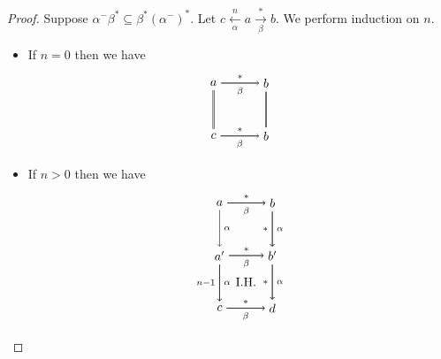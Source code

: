 \documentclass[autodetect-enginem]{article}
\theoremstyle{plain}
\theoremstyle{definition}
\begin{document}
\begin{proof}
    Suppose $\alpha^-\beta^* \subseteq \beta^*(\alpha^-)^*$.
    Let $c \xleftarrow[\alpha]{n} a \xrightarrow[\beta]{*} b$.
    We perform induction on $n$.
    \begin{itemize}
        \item If $n = 0$ then we have
            \[
            \begin{tikzpicture}[auto]
                \node (a) at (0,0) {$a$}; \node (b) at (1.5,0) {$b$};
                \node (c) at (0,-1.5) {$c$}; \node (b') at (1.5,-1.5) {$b$};
                \draw[->] (a) to node[above]{$\scriptstyle *$} (b);
                \draw[] (a) to node[below]{$\scriptstyle \beta$} (b);

                \draw[double] (a) to (c);

                \draw[double] (b) to (b');

                \draw[->] (c) to node[above]{$\scriptstyle *$} (b');
                \draw[] (c) to node[below]{$\scriptstyle \beta$} (b');

            \end{tikzpicture}
        \]
        \item If $n > 0$ then we have
            \[
                \begin{tikzpicture}[auto]
                \node (a) at (0,0) {$a$}; \node (b) at (1.5, 0) {$b$};
                \node (a') at (0, -1.5) {$a'$}; \node (b') at (1.5, -1.5) {$b'$};
                \node (c) at (0, -3) {$c$}; \node (d) at (1.5,-3) {$d$};
                \node (IH) at (0.75, -(1.5 + 0.75) {I.H.};

                \draw[->] (a) to node[above]{$\scriptstyle *$} (b);
                \draw[->] (a) to node[below]{$\scriptstyle \beta$} (b);
                
                \draw[->] (a) to node{$\scriptstyle \alpha$} (a');
                
                \draw[->] (a') to node[swap]{$\scriptstyle n-1$} (c);
                \draw[->] (a') to node{$\scriptstyle \alpha$} (c);

                \draw[->] (b) to node[swap]{$\scriptstyle *$} (b');
                \draw[->] (b) to node{$\scriptstyle \alpha$} (b');

                \draw[->] (b') to node[swap]{$\scriptstyle *$} (d);
                \draw[->] (b') to node{$\scriptstyle \alpha$} (d);

                \draw[->] (c) to node[above]{$\scriptstyle *$} (d);
                \draw[->] (c) to node[below]{$\scriptstyle \beta$} (d);

                \draw[->] (a') to node[above]{$\scriptstyle *$} (b');
                \draw[->] (a') to node[below]{$\scriptstyle \beta$} (b');
            \end{tikzpicture}
        \]
    \end{itemize}
\end{proof}
\end{document}
